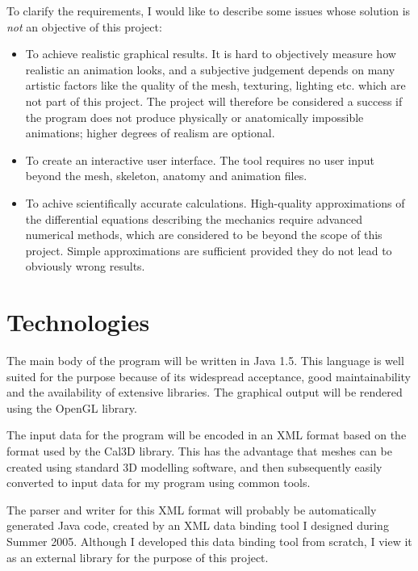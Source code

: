 \documentclass{article}
\begin{document}
To clarify the requirements, I would like to describe some issues
whose solution is {\em not} an objective of this project:

\begin{itemize}
\item To achieve realistic graphical results. It is hard to objectively
  measure how realistic an animation looks, and a subjective judgement
  depends on many artistic factors like the quality of the mesh,
  texturing, lighting etc. which are not part of this project. The
  project will therefore be considered a success if the program does
  not produce physically or anatomically impossible animations; higher
  degrees of realism are optional.

\item To create an interactive user interface. The tool requires no user
  input beyond the mesh, skeleton, anatomy and animation files.

\item To achive scientifically accurate calculations. High-quality
  approximations of the differential equations describing the
  mechanics require advanced numerical methods, which are considered
  to be beyond the scope of this project. Simple approximations are
  sufficient provided they do not lead to obviously wrong results.
\end{itemize}


\section{Technologies}

The main body of the program will be written in Java 1.5. This
language is well suited for the purpose because of its widespread
acceptance, good maintainability and the availability of extensive
libraries. The graphical output will be rendered using the OpenGL
library.

The input data for the program will be encoded in an XML format based
on the format used by the Cal3D library. This has the advantage that
meshes can be created using standard 3D modelling software, and then
subsequently easily converted to input data for my program using
common tools.

The parser and writer for this XML format will probably be
automatically generated Java code, created by an XML data binding tool
I designed during Summer 2005. Although I developed this data binding
tool from scratch, I view it as an external library for the purpose of
this project.
\end{document}

